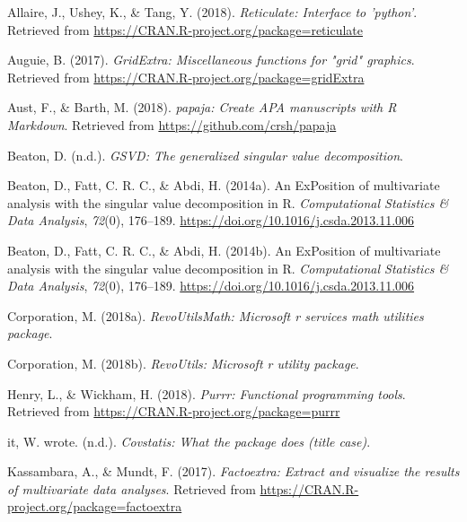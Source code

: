 \documentclass[man,floatsintext]{apa6}
\theoremstyle{definition}
\theoremstyle{definition}
\theoremstyle{definition}
\theoremstyle{remark}
\begin{document}
\begingroup
\setlength{\parindent}{-0.5in}
\setlength{\leftskip}{0.5in}

\hypertarget{refs}{}
\leavevmode\hypertarget{ref-R-reticulate}{}%
Allaire, J., Ushey, K., \& Tang, Y. (2018). \emph{Reticulate: Interface
to 'python'}. Retrieved from
\url{https://CRAN.R-project.org/package=reticulate}

\leavevmode\hypertarget{ref-R-gridExtra}{}%
Auguie, B. (2017). \emph{GridExtra: Miscellaneous functions for "grid"
graphics}. Retrieved from
\url{https://CRAN.R-project.org/package=gridExtra}

\leavevmode\hypertarget{ref-R-papaja}{}%
Aust, F., \& Barth, M. (2018). \emph{papaja: Create APA manuscripts with
R Markdown}. Retrieved from \url{https://github.com/crsh/papaja}

\leavevmode\hypertarget{ref-R-GSVD}{}%
Beaton, D. (n.d.). \emph{GSVD: The generalized singular value
decomposition}.

\leavevmode\hypertarget{ref-R-ExPosition}{}%
Beaton, D., Fatt, C. R. C., \& Abdi, H. (2014a). An ExPosition of
multivariate analysis with the singular value decomposition in R.
\emph{Computational Statistics \& Data Analysis}, \emph{72}(0),
176--189. \url{https://doi.org/10.1016/j.csda.2013.11.006}

\leavevmode\hypertarget{ref-R-prettyGraphs}{}%
Beaton, D., Fatt, C. R. C., \& Abdi, H. (2014b). An ExPosition of
multivariate analysis with the singular value decomposition in R.
\emph{Computational Statistics \& Data Analysis}, \emph{72}(0),
176--189. \url{https://doi.org/10.1016/j.csda.2013.11.006}

\leavevmode\hypertarget{ref-R-RevoUtilsMath}{}%
Corporation, M. (2018a). \emph{RevoUtilsMath: Microsoft r services math
utilities package}.

\leavevmode\hypertarget{ref-R-RevoUtils}{}%
Corporation, M. (2018b). \emph{RevoUtils: Microsoft r utility package}.

\leavevmode\hypertarget{ref-R-purrr}{}%
Henry, L., \& Wickham, H. (2018). \emph{Purrr: Functional programming
tools}. Retrieved from \url{https://CRAN.R-project.org/package=purrr}

\leavevmode\hypertarget{ref-R-covstatis}{}%
it, W. wrote. (n.d.). \emph{Covstatis: What the package does (title
case)}.

\leavevmode\hypertarget{ref-R-factoextra}{}%
Kassambara, A., \& Mundt, F. (2017). \emph{Factoextra: Extract and
visualize the results of multivariate data analyses}. Retrieved from
\url{https://CRAN.R-project.org/package=factoextra}
\end{document}
